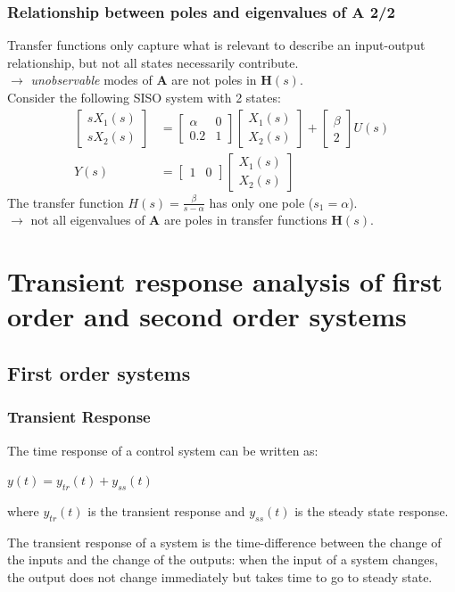 \begin{frame}
\frametitle{Relationship between poles and eigenvalues of $\mathbf{A}$ 2/2}
Transfer functions only capture what is relevant to describe an input-output relationship, but not all states necessarily contribute.\\
$\rightarrow$ \emph{unobservable} modes of $\mathbf{A}$ are not poles in $\mathbf{H}(s)$. \\
Consider the following SISO system with 2 states:
\begin{align*}
\begin{bmatrix} sX_1(s) \\ sX_2(s) \end{bmatrix} &= \begin{bmatrix} \alpha & 0 \\ 0.2 & 1 \end{bmatrix} \begin{bmatrix} X_1(s) \\ X_2(s) \end{bmatrix} + \begin{bmatrix} \beta \\ 2 \end{bmatrix} U(s) \\
Y(s) &= \begin{bmatrix} 1 & 0 \end{bmatrix} \begin{bmatrix} X_1(s) \\ X_2(s) \end{bmatrix}
\end{align*}
The transfer function $H(s) = \frac{\beta}{s-\alpha}$ has only one pole ($s_1 = \alpha$). \\
$\rightarrow$ {\color{blue}not all eigenvalues of $\mathbf{A}$ are poles in transfer functions $\mathbf{H}(s)$.}
\end{frame}


\section{Transient response analysis of first order and second order systems}

\subsection{First order systems}

\begin{frame}
\frametitle{Transient Response}
The time response of a control system can be written as:\\
\begin{center}
	$y(t) = y_{tr}(t) + y_{ss}(t)$
\end{center}
where $y_{tr}(t)$ is the transient response and $y_{ss}(t)$ is the steady state response.\\
\begin{definition}
	The transient response of a system is the time-difference between the change of the inputs and the change of the outputs: when the input of a system changes, the output does not change immediately but takes time to go to steady state.
\end{definition}
\end{frame}

